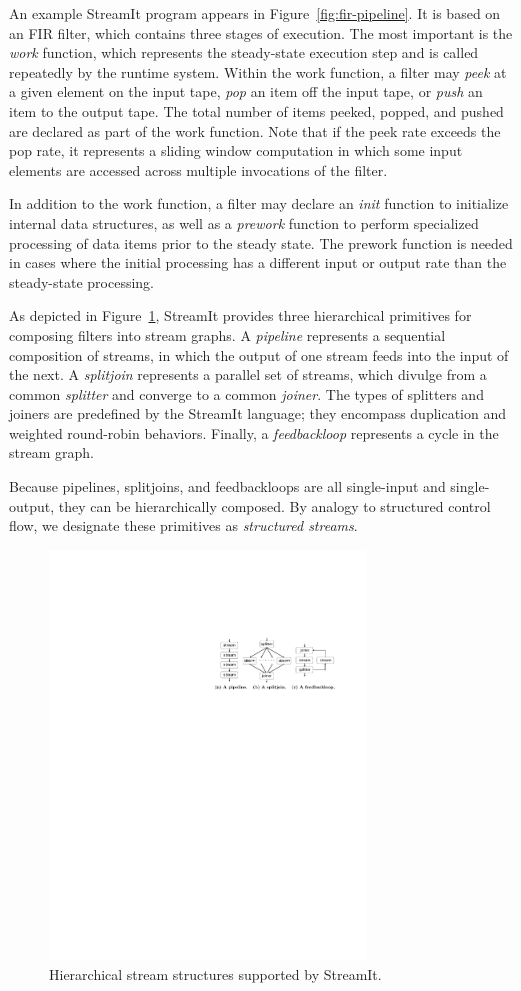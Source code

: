 An example StreamIt program appears in Figure~\ref{fig:fir-pipeline}.
It is based on an FIR filter, which contains three stages of
execution.  The most important is the {\it work} function, which
represents the steady-state execution step and is called repeatedly by
the runtime system.  Within the work function, a filter may {\it peek}
at a given element on the input tape, {\it pop} an item off the input
tape, or {\it push} an item to the output tape.  The total number of
items peeked, popped, and pushed are declared as part of the work
function.  Note that if the peek rate exceeds the pop rate, it
represents a sliding window computation in which some input elements
are accessed across multiple invocations of the filter.

In addition to the work function, a filter may declare an {\it init}
function to initialize internal data structures, as well as a {\it
  prework} function to perform specialized processing of data items
prior to the steady state.  The prework function is needed in cases
where the initial processing has a different input or output rate than
the steady-state processing.

As depicted in Figure~\ref{fig:structures}, StreamIt provides three
hierarchical primitives for composing filters into stream graphs.  A
{\it pipeline} represents a sequential composition of streams, in
which the output of one stream feeds into the input of the next.  A
{\it splitjoin} represents a parallel set of streams, which divulge
from a common {\it splitter} and converge to a common {\it joiner}.
The types of splitters and joiners are predefined by the StreamIt
language; they encompass duplication and weighted round-robin
behaviors.  Finally, a {\it feedbackloop} represents a cycle in the
stream graph.

\enlargethispage*{12pt}

Because pipelines, splitjoins, and feedbackloops are all single-input
and single-output, they can be hierarchically composed.  By analogy to
structured control flow, we designate these primitives as {\it
  structured streams}.

\begin{figure}[t!]
\centering
\includegraphics[width=3.3in]{stream-structures.pdf}
\caption{Hierarchical stream structures supported by StreamIt.\protect\label{fig:structures}}
\end{figure}

